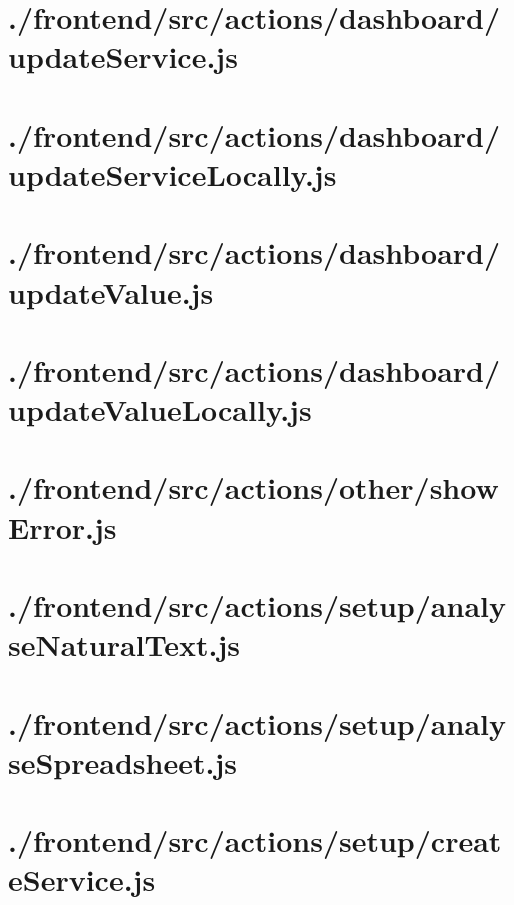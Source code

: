 \documentclass[11pt]{informatics-report}
\begin{document}
\newpage
\section{./frontend/src/actions/dashboard/updateService.js}


\newpage
\section{./frontend/src/actions/dashboard/updateServiceLocally.js}


\newpage
\section{./frontend/src/actions/dashboard/updateValue.js}


\newpage
\section{./frontend/src/actions/dashboard/updateValueLocally.js}


\newpage
\section{./frontend/src/actions/other/showError.js}


\newpage
\section{./frontend/src/actions/setup/analyseNaturalText.js}


\newpage
\section{./frontend/src/actions/setup/analyseSpreadsheet.js}


\newpage
\section{./frontend/src/actions/setup/createService.js}

\end{document}
